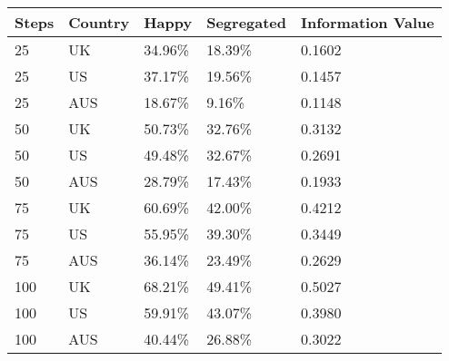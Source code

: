 \begin{table}[ht]
\centering
\begin{tabular}{lllll}
  \hline
Steps & Country & Happy & Segregated & Information Value \\ 
  \hline
25 & UK & 34.96\% & 18.39\% & 0.1602 \\ 
  25 & US & 37.17\% & 19.56\% & 0.1457 \\ 
  25 & AUS & 18.67\% & 9.16\% & 0.1148 \\ 
  50 & UK & 50.73\% & 32.76\% & 0.3132 \\ 
  50 & US & 49.48\% & 32.67\% & 0.2691 \\ 
  50 & AUS & 28.79\% & 17.43\% & 0.1933 \\ 
  75 & UK & 60.69\% & 42.00\% & 0.4212 \\ 
  75 & US & 55.95\% & 39.30\% & 0.3449 \\ 
  75 & AUS & 36.14\% & 23.49\% & 0.2629 \\ 
  100 & UK & 68.21\% & 49.41\% & 0.5027 \\ 
  100 & US & 59.91\% & 43.07\% & 0.3980 \\ 
  100 & AUS & 40.44\% & 26.88\% & 0.3022 \\ 
   \hline
\end{tabular}
\end{table}
